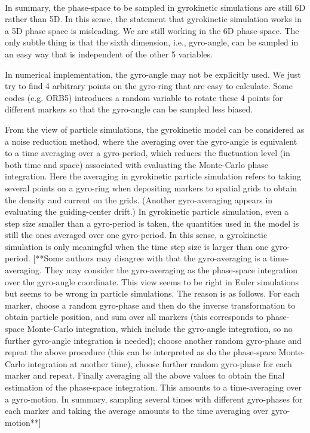 \documentclass{article}
\begin{document}
\

In summary, the phase-space to be sampled in gyrokinetic simulations are
still 6D rather than 5D. In this sense, the statement that gyrokinetic
simulation works in a 5D phase space is misleading. We are still working in
the 6D phase-space. The only subtle thing is that the sixth dimension, i.e.,
gyro-angle, can be sampled in an easy way that is independent of the other 5
variables.

In numerical implementation, the gyro-angle may not be explicitly used. We
just try to find 4 arbitrary points on the gyro-ring that are easy to
calculate. Some codes (e.g. ORB5) introduces a random variable to rotate these
4 points for different markers so that the gyro-angle can be sampled less
biased.

From the view of particle simulations, the gyrokinetic model can be
considered as a noise reduction method, where the averaging over the
gyro-angle is equivalent to a time averaging over a gyro-period, which reduces
the fluctuation level (in both time and space) associated with evaluating the
Monte-Carlo phase integration. Here the averaging in gyrokinetic particle
simulation refers to taking several points on a gyro-ring when depositing
markers to spatial grids to obtain the density and current on the grids.
(Another gyro-averaging appears in evaluating the guiding-center drift.) In
gyrokinetic particle simulation, even a step size smaller than a gyro-period
is taken, the quantities used in the model is still the ones averaged over one
gyro-period. In this sense, a gyrokinetic simulation is only meaningful when
the time step size is larger than one gyro-period. [**Some authors may
disagree with that the gyro-averaging is a time-averaging. They may consider
the gyro-averaging as the phase-space integration over the gyro-angle
coordinate. This view seems to be right in Euler simulations but seems to be
wrong in particle simulations. The reason is as follows. For each marker,
choose a random gyro-phase and then do the inverse transformation to obtain
particle position, and sum over all markers (this corresponds to phase-space
Monte-Carlo integration, which include the gyro-angle integration, so no
further gyro-angle integration is needed); choose another random gyro-phase
and repeat the above procedure (this can be interpreted as do the phase-space
Monte-Carlo integration at another time), choose further random gyro-phase for
each marker and repeat. Finally averaging all the above values to obtain the
final estimation of the phase-space integration. This amounts to a
time-averaging over a gyro-motion. In summary, sampling several times with
different gyro-phases for each marker and taking the average amounts to the
time averaging over gyro-motion**]
\end{document}
